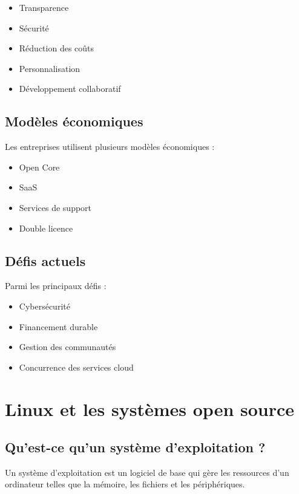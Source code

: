 \documentclass[12pt,a4paper]{report}
\begin{document}
\begin{itemize}
    \item Transparence
    \item Sécurité
    \item Réduction des coûts
    \item Personnalisation
    \item Développement collaboratif
\end{itemize}

\section{Modèles économiques}

Les entreprises utilisent plusieurs modèles économiques :

\begin{itemize}
    \item Open Core
    \item SaaS
    \item Services de support
    \item Double licence
\end{itemize}

\section{Défis actuels}

Parmi les principaux défis :

\begin{itemize}
    \item Cybersécurité
    \item Financement durable
    \item Gestion des communautés
    \item Concurrence des services cloud
\end{itemize}

\chapter{Linux et les systèmes open source}

\section{Qu’est-ce qu’un système d’exploitation ?}

Un système d’exploitation est un logiciel de base qui gère les ressources d’un ordinateur telles que la mémoire, les fichiers et les périphériques.
\end{document}
